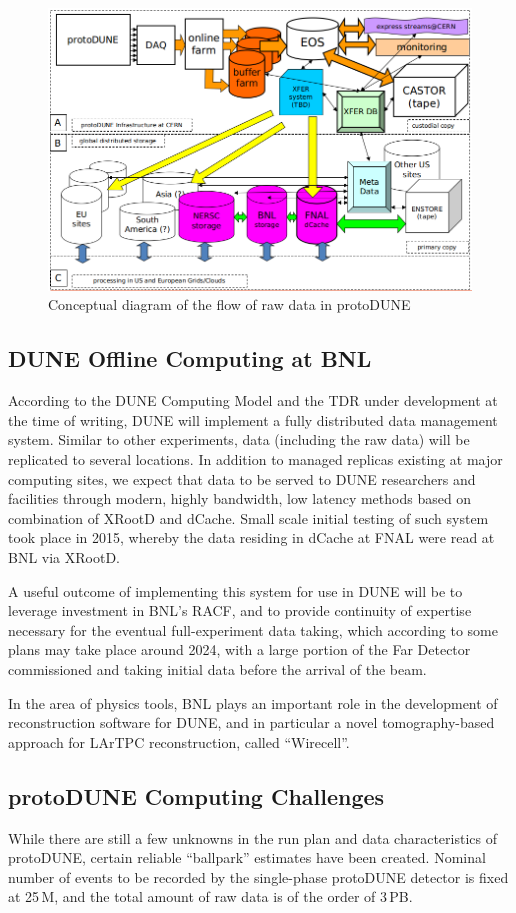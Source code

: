 \documentclass[pdftex,12pt,letter]{article}
\begin{document}
\begin{figure}[tbh]
\centering\includegraphics[width=0.8\linewidth]{protoDUNE_raw_data_concept.png}
\caption{\label{fig:raw_concept}Conceptual diagram of the flow of raw data in protoDUNE}
\end{figure}

\subsection{DUNE Offline Computing at BNL}
According to the DUNE Computing Model and the TDR under development at the time of writing,
DUNE will implement a fully distributed data management system. Similar to other experiments,
data (including the raw data) will be replicated to several locations. In addition to managed
replicas existing at major computing sites, we expect that data to be  served to DUNE
researchers and facilities through modern, highly bandwidth, low
latency methods based on combination of XRootD and dCache. Small scale initial testing
of such system took place in 2015, whereby the data residing in dCache at FNAL were read
at BNL via XRootD.

A useful outcome of implementing this system for use in DUNE will be to leverage
investment in BNL's RACF, and to
provide continuity of expertise necessary for the eventual
full-experiment data taking, which according to some plans may take
place around 2024, with a large portion of the Far Detector
commissioned and taking initial data before the arrival of the beam.

In the area of physics tools, BNL plays an important role in the development of reconstruction software for DUNE, and
in particular a novel tomography-based approach for LArTPC reconstruction, called ``Wirecell''.


\subsection{protoDUNE Computing Challenges}
While there are still a few unknowns in the run plan and data characteristics of protoDUNE, certain
reliable ``ballpark'' estimates have been created. Nominal number of events to be recorded by the single-phase
protoDUNE detector is fixed at 25\,M, and the total amount of raw data is of the order of 3\,PB.
\end{document}
